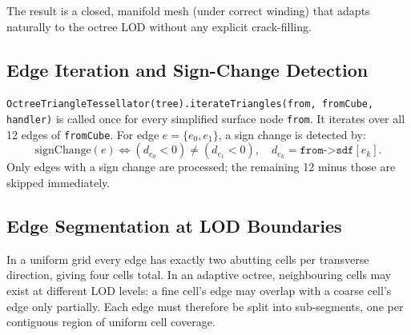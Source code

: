 \documentclass[10pt,a4paper]{article}
\begin{document}
\noindent The result is a closed, manifold mesh (under correct winding) that
adapts naturally to the octree LOD without any explicit crack-filling.

\subsection{Edge Iteration and Sign-Change Detection}

\lstinline{OctreeTriangleTessellator(tree).iterateTriangles(from, fromCube, handler)} is called once for
every simplified surface node \lstinline{from}.  It iterates over all 12
edges of \lstinline{fromCube}.  For edge $e = \{e_0, e_1\}$, a sign
change is detected by:
\[
  \text{signChange}(e) \iff
    (d_{e_0} < 0) \neq (d_{e_1} < 0),
  \quad
  d_{e_k} = \texttt{from->sdf}[e_k].
\]
Only edges with a sign change are processed; the remaining 12 minus
those are skipped immediately.

\subsection{Edge Segmentation at LOD Boundaries}
\label{sec:itriangles:segseg}

In a uniform grid every edge has exactly two abutting cells per
transverse direction, giving four cells total.  In an adaptive octree,
neighbouring cells may exist at different LOD levels: a fine cell's edge
may overlap with a coarse cell's edge only partially.  Each edge must
therefore be split into sub-segments, one per contiguous region of
uniform cell coverage.
\end{document}
